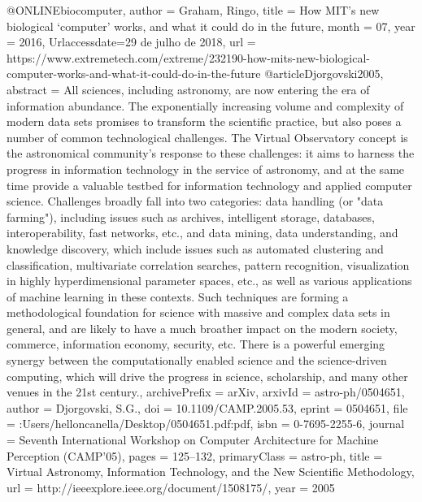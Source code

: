 @ONLINE{biocomputer,
	author = {Graham, Ringo},
	title = {How MIT’s new biological ‘computer’ works, and what it could do in the future},
	month = {07},
	year = {2016},
	Urlaccessdate={29 de julho de 2018},
	url = {https://www.extremetech.com/extreme/232190-how-mits-new-biological-computer-works-and-what-it-could-do-in-the-future}
}
@article{Djorgovski2005,
abstract = {All sciences, including astronomy, are now entering the era of information abundance. The exponentially increasing volume and complexity of modern data sets promises to transform the scientific practice, but also poses a number of common technological challenges. The Virtual Observatory concept is the astronomical community's response to these challenges: it aims to harness the progress in information technology in the service of astronomy, and at the same time provide a valuable testbed for information technology and applied computer science. Challenges broadly fall into two categories: data handling (or "data farming"), including issues such as archives, intelligent storage, databases, interoperability, fast networks, etc., and data mining, data understanding, and knowledge discovery, which include issues such as automated clustering and classification, multivariate correlation searches, pattern recognition, visualization in highly hyperdimensional parameter spaces, etc., as well as various applications of machine learning in these contexts. Such techniques are forming a methodological foundation for science with massive and complex data sets in general, and are likely to have a much broather impact on the modern society, commerce, information economy, security, etc. There is a powerful emerging synergy between the computationally enabled science and the science-driven computing, which will drive the progress in science, scholarship, and many other venues in the 21st century.},
archivePrefix = {arXiv},
arxivId = {astro-ph/0504651},
author = {Djorgovski, S.G.},
doi = {10.1109/CAMP.2005.53},
eprint = {0504651},
file = {:Users/helloncanella/Desktop/0504651.pdf:pdf},
isbn = {0-7695-2255-6},
journal = {Seventh International Workshop on Computer Architecture for Machine Perception (CAMP'05)},
pages = {125--132},
primaryClass = {astro-ph},
title = {{Virtual Astronomy, Information Technology, and the New Scientific Methodology}},
url = {http://ieeexplore.ieee.org/document/1508175/},
year = {2005}
}

